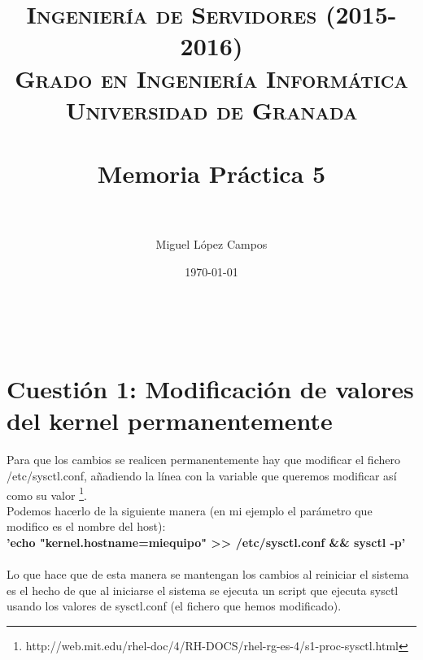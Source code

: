 

\title{	
\normalfont \normalsize 
\textsc{{\bf Ingeniería de Servidores (2015-2016)} \\ Grado en Ingeniería Informática \\ Universidad de Granada} \\ [25pt] %
\horrule{0.5pt} \\[0.4cm] %
\huge Memoria Práctica 5 \\ %
\horrule{2pt} \\[0.5cm] %
}


\author{Miguel López Campos} %

\date{\normalsize\today} %


	
	\maketitle %
	\newpage %
	
	\tableofcontents %
	\listoffigures

	
	\newpage
	
	\
	
	\section{Cuestión 1: Modificación de valores del kernel permanentemente}
	Para que los cambios se realicen permanentemente hay que modificar el fichero /etc/sysctl.conf, añadiendo la línea con la variable que queremos modificar así como su valor \footnote{ http://web.mit.edu/rhel-doc/4/RH-DOCS/rhel-rg-es-4/s1-proc-sysctl.html}.
	\\
	Podemos hacerlo de la siguiente manera (en mi ejemplo el parámetro que modifico es el nombre del host):
	\\
	\textbf{'echo "kernel.hostname=miequipo" >> /etc/sysctl.conf   \&\&  sysctl -p'}
	\\
	\\
	
	Lo que hace que de esta manera se mantengan los cambios al reiniciar el sistema es el hecho de que al iniciarse el sistema se ejecuta un script que ejecuta sysctl usando los valores de sysctl.conf (el fichero que hemos modificado).
	
